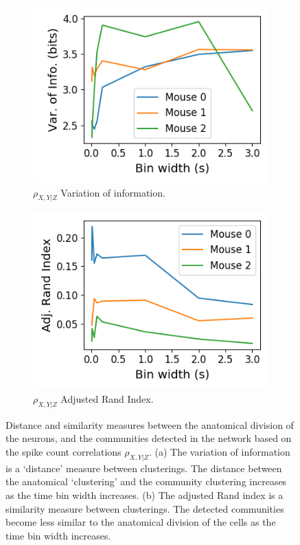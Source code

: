   \begin{figure}[h]
    \begin{subfigure}[h]{0.5\linewidth}
      \includegraphics[width=\linewidth]{figures/eight_probe/variation_of_information_rectified_conditional.png}
      \caption{$\rho_{X,Y|Z}$ Variation of information.}
      \label{fig:variation_of_information_rectified_conditional}
    \end{subfigure}
    \begin{subfigure}[h]{0.5\linewidth}
      \includegraphics[width=\linewidth]{figures/eight_probe/adjusted_rand_index_rectified_conditional.png}
      \caption{$\rho_{X,Y|Z}$ Adjusted Rand Index.}
      \label{fig:adjusted_rand_index_rectified_conditional}
    \end{subfigure}
    \caption{Distance and similarity measures between the anatomical division of the neurons, and the communities detected in the network based on the spike count correlations $\rho_{X,Y|Z}$. (a) The variation of information is a `distance' measure between clusterings. The distance between the anatomical `clustering' and the community clustering increases as the time bin width increases. (b) The adjusted Rand index is a similarity measure between clusterings. The detected communities become less similar to the anatomical division of the cells as the time bin width increases.}
    \label{fig:conditional_clustering_distance_measures}
  \end{figure}

